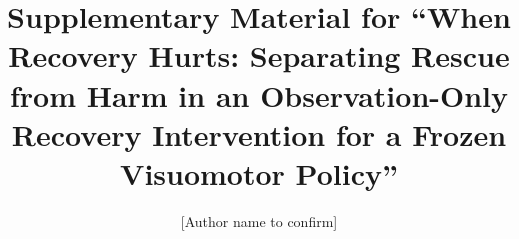 \documentclass[preprint,12pt]{elsarticle}
\newcommand{\secdir}{}
\begin{document}
\begin{frontmatter}
\title{Supplementary Material for ``When Recovery Hurts: Separating Rescue from Harm in an Observation-Only Recovery Intervention for a Frozen Visuomotor Policy''}
\author{[Author name to confirm]}
\end{frontmatter}











\end{document}
